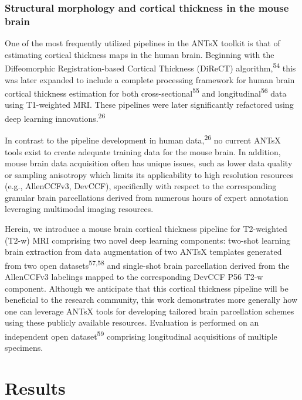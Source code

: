 \documentclass[
  12pt,
]{article}
\begin{document}
\hypertarget{structural-morphology-and-cortical-thickness-in-the-mouse-brain}{%
\subsubsection{Structural morphology and cortical thickness in the mouse
brain}\label{structural-morphology-and-cortical-thickness-in-the-mouse-brain}}

One of the most frequently utilized pipelines in the ANTsX toolkit is
that of estimating cortical thickness maps in the human brain. Beginning
with the Diffeomorphic Registration-based Cortical Thickness (DiReCT)
algorithm,\textsuperscript{54} this was later expanded to include a
complete processing framework for human brain cortical thickness
estimation for both cross-sectional\textsuperscript{55} and
longitudinal\textsuperscript{56} data using T1-weighted MRI. These
pipelines were later significantly refactored using deep learning
innovations.\textsuperscript{26}

In contrast to the pipeline development in human
data,\textsuperscript{26} no current ANTsX tools exist to create
adequate training data for the mouse brain. In addition, mouse brain
data acquisition often has unique issues, such as lower data quality or
sampling anisotropy which limits its applicability to high resolution
resources (e.g., AllenCCFv3, DevCCF), specifically with respect to the
corresponding granular brain parcellations derived from numerous hours
of expert annotation leveraging multimodal imaging resources.

Herein, we introduce a mouse brain cortical thickness pipeline for
T2-weighted (T2-w) MRI comprising two novel deep learning components:
two-shot learning brain extraction from data augmentation of two ANTsX
templates generated from two open datasets\textsuperscript{57,58} and
single-shot brain parcellation derived from the AllenCCFv3 labelings
mapped to the corresponding DevCCF P56 T2-w component. Although we
anticipate that this cortical thickness pipeline will be beneficial to
the research community, this work demonstrates more generally how one
can leverage ANTsX tools for developing tailored brain parcellation
schemes using these publicly available resources. Evaluation is
performed on an independent open dataset\textsuperscript{59} comprising
longitudinal acquisitions of multiple specimens.

\clearpage
\newpage

\hypertarget{results}{%
\section{Results}\label{results}}
\end{document}
